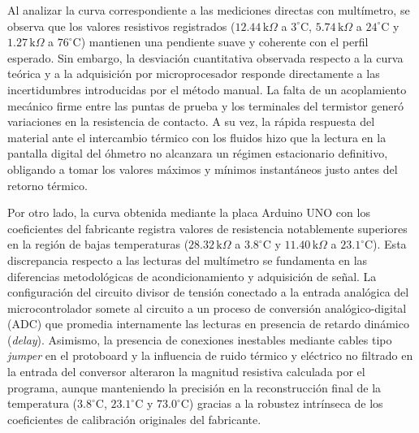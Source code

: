 Al analizar la curva correspondiente a las mediciones directas con multímetro, se observa que los valores resistivos registrados ($12.44\,\text{k}\Omega$ a $3^{\circ}\text{C}$, $5.74\,\text{k}\Omega$ a $24^{\circ}\text{C}$ y $1.27\,\text{k}\Omega$ a $76^{\circ}\text{C}$) mantienen una pendiente suave y coherente con el perfil esperado. Sin embargo, la desviación cuantitativa observada respecto a la curva teórica y a la adquisición por microprocesador responde directamente a las incertidumbres introducidas por el método manual. La falta de un acoplamiento mecánico firme entre las puntas de prueba y los terminales del termistor generó variaciones en la resistencia de contacto. A su vez, la rápida respuesta del material ante el intercambio térmico con los fluidos hizo que la lectura en la pantalla digital del óhmetro no alcanzara un régimen estacionario definitivo, obligando a tomar los valores máximos y mínimos instantáneos justo antes del retorno térmico.

Por otro lado, la curva obtenida mediante la placa Arduino UNO con los coeficientes del fabricante registra valores de resistencia notablemente superiores en la región de bajas temperaturas ($28.32\,\text{k}\Omega$ a $3.8^{\circ}\text{C}$ y $11.40\,\text{k}\Omega$ a $23.1^{\circ}\text{C}$). Esta discrepancia respecto a las lecturas del multímetro se fundamenta en las diferencias metodológicas de acondicionamiento y adquisición de señal. La configuración del circuito divisor de tensión conectado a la entrada analógica del microcontrolador somete al circuito a un proceso de conversión analógico-digital (ADC) que promedia internamente las lecturas en presencia de retardo dinámico (\textit{delay}). Asimismo, la presencia de conexiones inestables mediante cables tipo \textit{jumper} en el protoboard y la influencia de ruido térmico y eléctrico no filtrado en la entrada del conversor alteraron la magnitud resistiva calculada por el programa, aunque manteniendo la precisión en la reconstrucción final de la temperatura ($3.8^{\circ}\text{C}$, $23.1^{\circ}\text{C}$ y $73.0^{\circ}\text{C}$) gracias a la robustez intrínseca de los coeficientes de calibración originales del fabricante.
